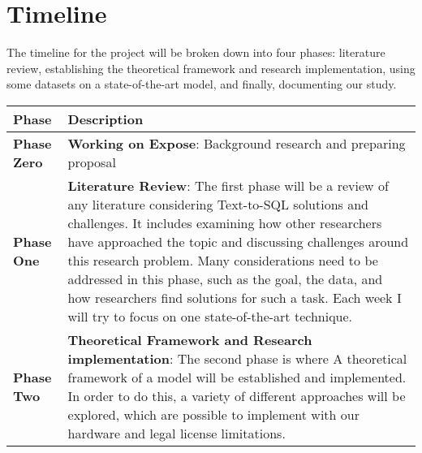 
\newpage
\section{Timeline}

The timeline for the project will be broken down into four phases: literature review, establishing the theoretical framework and research implementation, using some datasets on a state-of-the-art model, and finally, documenting our study.

\begin{tabular}{|l|p{12cm}|}
    \hline
    Phase                & Description                                                                                                                                                                                                                                                                                                                                                                                                                                                             \\
    \hline
    \textbf{Phase Zero}  & \textbf{Working on Expose}: Background research and preparing proposal                                                                                                                                                                                                                                                                                                                                                                                                  \\
    \hline
    \textbf{Phase One}   & \textbf{Literature Review}: The first phase will be a review of any literature considering Text-to-SQL solutions and challenges. It includes examining how other researchers have approached the topic and discussing challenges around this research problem. Many considerations need to be addressed in this phase, such as the goal, the data, and how researchers find solutions for such a task. Each week I will try to focus on one state-of-the-art technique. \\
    \hline
    \textbf{Phase Two}   & \textbf{Theoretical Framework and Research implementation}: The second phase is where A theoretical framework of a model will be established and implemented. In order to do this, a variety of different approaches will be explored, which are possible to implement with our hardware and legal license limitations.                                                                                                                                                 \\

\end{tabular}
